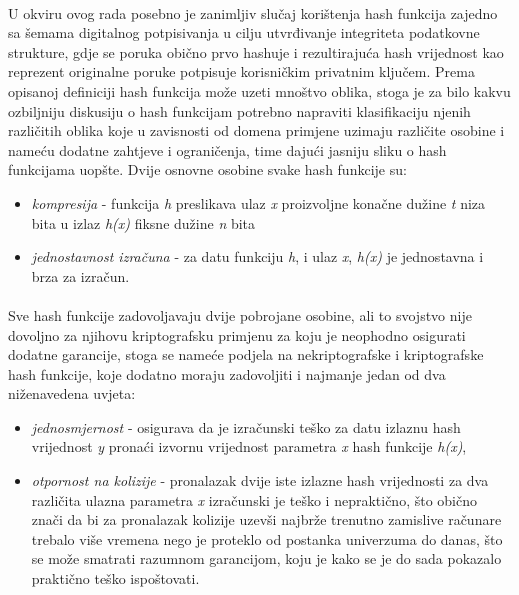 \paragraph*{}
U okviru ovog rada posebno je zanimljiv slučaj korištenja hash funkcija zajedno sa šemama digitalnog potpisivanja u cilju utvrđivanje integriteta podatkovne strukture, gdje se poruka obično prvo hashuje i rezultirajuća hash vrijednost kao reprezent originalne poruke potpisuje korisničkim privatnim ključem. Prema opisanoj definiciji hash funkcija može uzeti mnoštvo oblika, stoga je za bilo kakvu ozbiljniju diskusiju o hash funkcijam potrebno napraviti klasifikaciju njenih različitih oblika koje u zavisnosti od domena primjene uzimaju različite osobine i nameću dodatne zahtjeve i ograničenja, time dajući jasniju sliku o hash funkcijama uopšte. Dvije osnovne osobine svake hash funkcije su:

\begin{itemize}
    \item \textit{kompresija} - funkcija \textit{h} preslikava ulaz \textit{x} proizvoljne konačne dužine \textit{t} niza bita u izlaz \textit{h(x)} fiksne dužine \textit{n} bita
    \item \textit{jednostavnost izračuna} - za datu funkciju \textit{h}, i ulaz \textit{x}, \textit{h(x)} je jednostavna i brza za izračun.
\end{itemize}

\paragraph*{}
Sve hash funkcije zadovoljavaju dvije pobrojane osobine, ali to svojstvo nije dovoljno za njihovu kriptografsku primjenu za koju je neophodno osigurati dodatne garancije, stoga se nameće podjela na nekriptografske i kriptografske hash funkcije, koje dodatno moraju zadovoljiti i najmanje jedan od dva niženavedena uvjeta:

\begin{itemize}
    \item \textit{jednosmjernost} - osigurava da je izračunski teško za datu izlaznu hash vrijednost \textit{y} pronaći izvornu vrijednost parametra \textit{x} hash funkcije \textit{h(x)},
    \item \textit{otpornost na kolizije} - pronalazak dvije iste izlazne hash vrijednosti za dva različita ulazna parametra \textit{x} izračunski je teško i nepraktično, što obično znači da bi za pronalazak kolizije uzevši najbrže trenutno zamislive računare trebalo više vremena nego je proteklo od postanka univerzuma do danas, što se može smatrati razumnom garancijom, koju je kako se je do sada pokazalo praktično teško ispoštovati.
\end{itemize}

